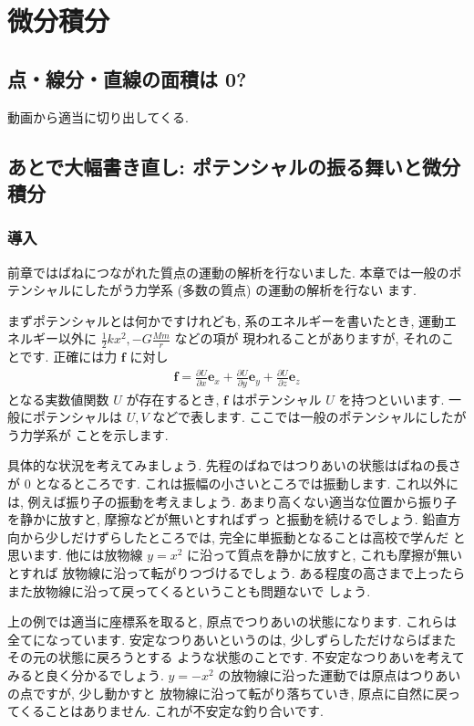\documentclass[openany, a4paper, oneside]{book}
\theoremstyle{break}
\theoremstyle{breakdefn}
\begin{document}
\part{微分積分}
\label{sec-5}
\chapter{点・線分・直線の面積は 0?}
\label{sec-5-1}

動画から適当に切り出してくる.
\chapter{あとで大幅書き直し: ポテンシャルの振る舞いと微分積分}
\label{sec-5-2}
\section{導入}
\label{sec-5-2-1}

前章ではばねにつながれた質点の運動の解析を行ないました.
本章では一般のポテンシャルにしたがう力学系 (多数の質点) の運動の解析を行ない
ます.

まずポテンシャルとは何かですけれども,
系のエネルギーを書いたとき, 運動エネルギー以外に
$\frac{1}{2}kx^2,-G\frac{Mm}{r}$ などの項が
現われることがありますが, それのことです.
正確には力 $\bm{f}$ に対し
\begin{align}
\bm{f} =
\frac{ \partial U }{\partial x}\bm{e}_{x} + \frac{ \partial U}{\partial y}\bm{e}_{y} +
\frac{ \partial U}{\partial z}\bm{e}_{z}
\end{align}
となる実数値関数 $U$ が存在するとき,  $\bm{f}$ はポテンシャル $U$ を持つといいます.
一般にポテンシャルは $U,V$ などで表します.
ここでは一般のポテンシャルにしたがう力学系が
ことを示します.

具体的な状況を考えてみましょう.
先程のばねではつりあいの状態はばねの長さが 0 となるところです.
これは振幅の小さいところでは振動します.
これ以外には, 例えば振り子の振動を考えましょう.
あまり高くない適当な位置から振り子を静かに放すと, 摩擦などが無いとすればずっ
と振動を続けるでしょう.
鉛直方向から少しだけずらしたところでは, 完全に単振動となることは高校で学んだ
と思います.
他には放物線 $y=x^2$ に沿って質点を静かに放すと, これも摩擦が無いとすれば
放物線に沿って転がりつづけるでしょう.
ある程度の高さまで上ったらまた放物線に沿って戻ってくるということも問題ないで
しょう.

上の例では適当に座標系を取ると, 原点でつりあいの状態になります.
これらは全てになっています.
安定なつりあいというのは, 少しずらしただけならばまたその元の状態に戻ろうとする
ような状態のことです.
不安定なつりあいを考えてみると良く分かるでしょう.
 $y=-x^2$ の放物線に沿った運動では原点はつりあいの点ですが, 少し動かすと
放物線に沿って転がり落ちていき, 原点に自然に戻ってくることはありません.
これが不安定な釣り合いです.
\end{document}
